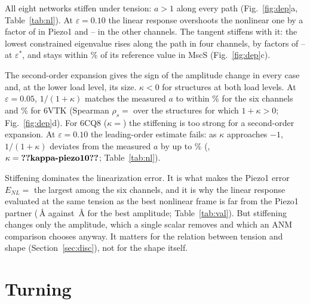 \documentclass[preprint,12pt,a4paper]{elsarticle}
\newcommand{\eps}{\varepsilon}
\begin{document}


All eight networks stiffen under tension: $a>1$ along every path (Fig.~\ref{fig:dep}a, Table~\ref{tab:nl}). At $\eps=0.10$ the linear response overshoots the nonlinear one by a factor of  in Piezo1 and -- in the other channels. The tangent stiffens with it: the lowest constrained eigenvalue rises along the path in four channels, by factors of -- at $\eps^*$, and stays within \% of its reference value in MscS (Fig.~\ref{fig:dep}c).

The second-order expansion gives the sign of the amplitude change in every case and, at the lower load level, its size. $\kappa<0$ for  structures at both load levels. At $\eps=0.05$, $1/(1+\kappa)$ matches the measured $a$ to within \% for the six channels and \% for 6VTK (Spearman $\rho_s=$ over the  structures for which $1+\kappa>0$; Fig.~\ref{fig:dep}d). For 6CQ8 ($\kappa=$) the stiffening is too strong for a second-order expansion. At $\eps=0.10$ the leading-order estimate fails: as $\kappa$ approaches $-1$, $1/(1+\kappa)$ deviates from the measured $a$ by up to \% (, $\kappa=\V{kappa-piezo10}$; Table~\ref{tab:nl}).

Stiffening dominates the linearization error. It is what makes the Piezo1 error $E_{NL}=$ the largest among the six channels, and it is why the linear response evaluated at the same tension as the best nonlinear frame is far from the Piezo1 partner (\,\AA{} against \,\AA{} for the best amplitude; Table~\ref{tab:val}). But stiffening changes only the amplitude, which a single scalar removes and which an ANM comparison chooses anyway. It matters for the relation between tension and shape (Section~\ref{sec:disc}), not for the shape itself.

\section{Turning}
\label{sec:turn}
\end{document}
